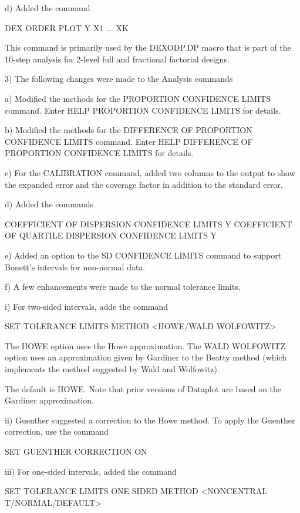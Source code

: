     d) Added the command

         DEX ORDER PLOT Y X1 ... XK

       This command is primarily used by the DEXODP.DP macro that is
       part of the 10-step analysis for 2-level full and fractional
       factorial designs.

 3) The following changes were made to the Analysis commands

    a) Modified the methods for the PROPORTION CONFIDENCE LIMITS
       command.  Enter HELP PROPORTION CONFIDENCE LIMITS for details.

    b) Modified the methods for the DIFFERENCE OF PROPORTION CONFIDENCE
       LIMITS command.  Enter HELP DIFFERENCE OF PROPORTION CONFIDENCE
       LIMITS for details.

    c) For the CALIBRATION command, added two columns to the output to
       show the expanded error and the coverage factor in addition to
       the standard error.

    d) Added the commands

           COEFFICIENT OF DISPERSION CONFIDENCE LIMITS Y
           COEFFICIENT OF QUARTILE DISPERSION CONFIDENCE LIMITS Y

    e) Added an option to the SD CONFIDENCE LIMITS command to
       support Bonett's intervals for non-normal data.

    f) A few enhancements were made to the normal tolerance limits.

          i) For two-sided intervals, adde the command

                SET TOLERANCE LIMITS METHOD <HOWE/WALD WOLFOWITZ>

             The HOWE option uses the Howe approximation.  The
             WALD WOLFOWITZ option uses an approximation given
             by Gardiner to the Beatty method (which implements
             the method suggested by Wald and Wolfowitz).

             The default is HOWE.  Note that prior versions of
             Dataplot are based on the Gardiner approximation.

         ii) Guenther suggested a correction to the Howe method.
             To apply the Guenther correction, use the command

                SET GUENTHER CORRECTION ON

        iii) For one-sided intervals, added the command

                SET TOLERANCE LIMITS ONE SIDED METHOD
                    <NONCENTRAL T/NORMAL/DEFAULT>

